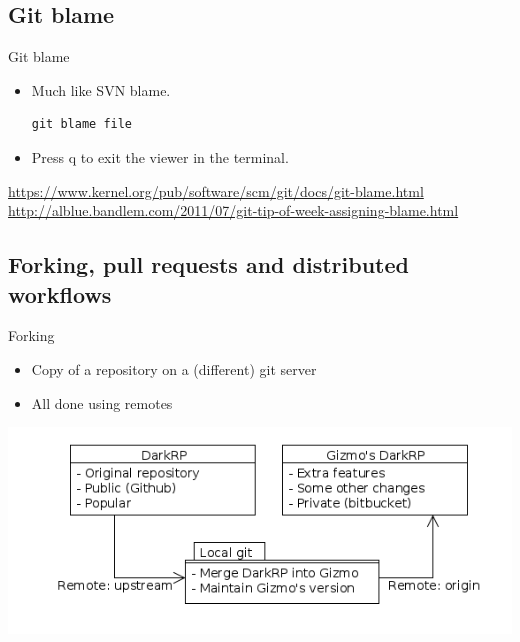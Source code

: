 \documentclass[10pt,a4paper]{beamer}
\begin{document}
\subsection{Git blame}
\begin{frame}[fragile]{Git blame}
\begin{itemize}
\item Much like SVN blame.
\begin{verbatim}git blame file\end{verbatim}
\item Press q to exit the viewer in the terminal.
\end{itemize}
\href{https://www.kernel.org/pub/software/scm/git/docs/git-blame.html}{\color{blue}https://www.kernel.org/pub/software/scm/git/docs/git-blame.html}
\href{http://alblue.bandlem.com/2011/07/git-tip-of-week-assigning-blame.html}{\color{blue}http://alblue.bandlem.com/2011/07/git-tip-of-week-assigning-blame.html}
\end{frame}

\subsection{Forking, pull requests and distributed workflows}

\begin{frame}{Forking}
\begin{itemize}
\item Copy of a repository on a (different) git server
\item All done using remotes
\end{itemize}
\includegraphics[width=\linewidth]{fork.png}
\end{frame}
\end{document}
